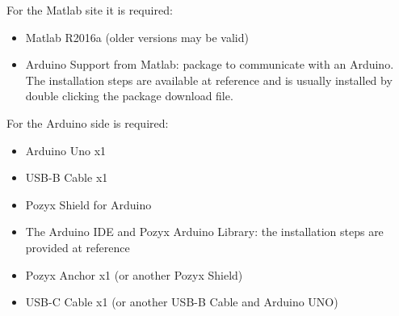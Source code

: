 \documentclass[a4paper, 21pt]{article} %
\begin{document}
For the Matlab site it is required:
\begin{itemize}
\item Matlab R2016a (older versions may be valid)
\item Arduino Support from Matlab: package to communicate with an Arduino. The installation steps are available at reference \cite{Matlab:Arduino} and is usually installed by double clicking the package download file.
\end{itemize}

For the Arduino side is required:
\begin{itemize}
\item Arduino Uno x1
\item USB-B Cable x1
\item Pozyx Shield for Arduino
\item  The Arduino IDE and Pozyx Arduino Library: the installation steps are provided at reference \cite{Arduino:Started}
\item Pozyx Anchor x1 (or another Pozyx Shield)
\item  USB-C Cable x1 (or another USB-B Cable and Arduino UNO)
\end{itemize}

\end{document}
